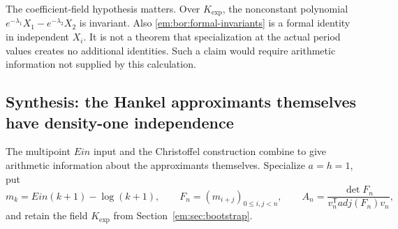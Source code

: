 \documentclass[11pt,a4paper]{article}
\theoremstyle{definition}
\theoremstyle{remark}
\theoremstyle{plain}
\numberwithin{equation}{section}
\def\operatorname#1{#1}\def\mathrm#1{#1}}
\begin{document}
The coefficient-field hypothesis matters.  Over $K_{\exp}$, the
nonconstant polynomial $e^{-\lambda_1}X_1-e^{-\lambda_2}X_2$
is invariant.  Also \eqref{em:bor:formal-invariants} is a formal identity
in independent $X_i$.  It is not a theorem that specialization at the
actual period values creates no additional identities.  Such a claim
would require arithmetic information not supplied by this calculation.

\subsection{Synthesis: the Hankel approximants themselves have density-one independence}
\label{em:sec:hankel-independence}

The multipoint $\operatorname{Ein}$ input and the Christoffel construction
combine to give arithmetic information about the approximants themselves.
Specialize $a=h=1$, put
\[
 m_k=\operatorname{Ein}(k+1)-\log(k+1),\qquad
 F_n=(m_{i+j})_{0\le i,j<n},\qquad
 A_n=\frac{\det F_n}{v_n^{\mathsf T}\operatorname{adj}(F_n)v_n},
\]
and retain the field $K_{\exp}$ from Section~\ref{em:sec:bootstrap}.
\end{document}

